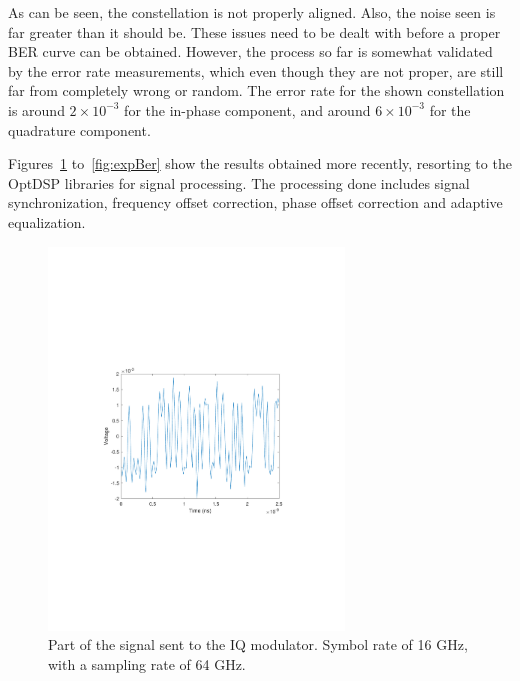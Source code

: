 \begin{refsection}
As can be seen, the constellation is not properly aligned. Also, the noise seen is far greater than it should be. These issues need to be dealt with before a proper BER curve can be obtained. However, the process so far is somewhat validated by the error rate measurements, which even though they are not proper, are still far from completely wrong or random. The error rate for the shown constellation is around $2 \times 10^{-3}$ for the in-phase component, and around $6 \times 10^{-3}$ for the quadrature component.

Figures~\ref{fig:newQamTxSig} to~\ref{fig:expBer} show the results obtained more recently, resorting to the OptDSP libraries for signal processing. The processing done includes signal synchronization, frequency offset correction, phase offset correction and adaptive equalization.

\begin{figure}[H]
	\centering
	\includegraphics[clip, trim=4cm 8cm 4cm 8cm, width=0.7\textwidth]{./sdf/m_qam_system/figures/experimentalTxSnr4Sr16.pdf}
	\caption{Part of the signal sent to the IQ modulator. Symbol rate of 16 GHz, with a sampling rate of 64 GHz.}
	\label{fig:newQamTxSig}
\end{figure}


\end{refsection}
